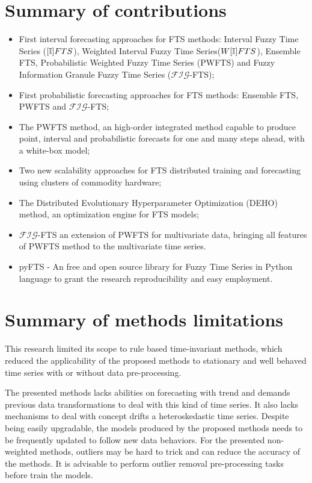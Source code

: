 \section{Summary of contributions}
\begin{itemize}
    \item First interval forecasting approaches for FTS methods: Interval Fuzzy Time Series ($[\mathbb{I}]FTS$), Weighted Interval Fuzzy Time Series($W[\mathbb{I}]FTS$), Ensemble FTS, Probabilistic Weighted Fuzzy Time Series  (PWFTS) and Fuzzy Information Granule Fuzzy Time Series ($\mathcal{FIG}$-FTS);
    \item First probabilistic forecasting approaches for FTS methods:  Ensemble FTS, PWFTS and $\mathcal{FIG}$-FTS; 
    \item The PWFTS method, an high-order integrated method capable to produce point, interval and probabilistic forecasts for one and many steps ahead, with a white-box model;
    \item Two new scalability approaches for FTS distributed training and forecasting using clusters of commodity hardware;
    \item The Distributed Evolutionary Hyperparameter Optimization (DEHO) method, an optimization engine for FTS models;
    \item $\mathcal{FIG}$-FTS an extension of PWFTS for multivariate data, bringing all features of PWFTS method to the multivariate time series.
    \item pyFTS - An free and open source library for Fuzzy Time Series in Python language to grant the research reproducibility and easy employment.
\end{itemize}

\section{Summary of methods limitations}

This research limited its scope to rule based time-invariant methods,   which reduced the applicability of the proposed methods to stationary and well behaved time series with or without data pre-processing. 

The presented methods lacks abilities on forecasting with trend and  demands previous data transformations to deal with this kind of time series. It also lacks mechanisms to deal with concept drifts a heteroskedastic time series. Despite being easily upgradable, the models produced by the proposed methods needs to be frequently updated to follow new data behaviors. For the presented non-weighted methods, outliers may be hard to trick and can reduce the accuracy of the methods. It is advisable to perform outlier removal pre-processing tasks before train the models. 

